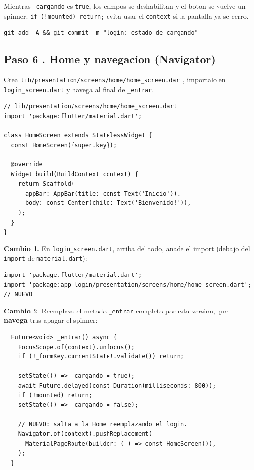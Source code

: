 \documentclass[11pt,a4paper,oneside]{book}
\newcommand{\file}[1]{\texttt{\textcolor{brandDark}{#1}}}
\begin{document}
\begin{whatbox}
Mientras \texttt{\_cargando} es \texttt{true}, los campos se deshabilitan y el boton
se vuelve un spinner. \texttt{if (!mounted) return;} evita usar el \texttt{context}
si la pantalla ya se cerro.
\end{whatbox}

\begin{lstlisting}[language={},numbers=none]
git add -A && git commit -m "login: estado de cargando"
\end{lstlisting}

\subsection*{Paso 6 . Home y navegacion (Navigator)}
\begin{wherebox}
Crea \file{lib/presentation/screens/home/home\_screen.dart}, importalo en
\file{login\_screen.dart} y navega al final de \texttt{\_entrar}.
\end{wherebox}

\begin{lstlisting}
// lib/presentation/screens/home/home_screen.dart
import 'package:flutter/material.dart';

class HomeScreen extends StatelessWidget {
  const HomeScreen({super.key});

  @override
  Widget build(BuildContext context) {
    return Scaffold(
      appBar: AppBar(title: const Text('Inicio')),
      body: const Center(child: Text('Bienvenido!')),
    );
  }
}
\end{lstlisting}

\noindent\textbf{Cambio 1.} En \file{login\_screen.dart}, arriba del todo, anade el
import (debajo del \texttt{import} de \texttt{material.dart}):
\begin{lstlisting}
import 'package:flutter/material.dart';
import 'package:app_login/presentation/screens/home/home_screen.dart';   // NUEVO
\end{lstlisting}

\noindent\textbf{Cambio 2.} Reemplaza el metodo \texttt{\_entrar} completo por esta
version, que \textbf{navega} tras apagar el spinner:
\begin{lstlisting}
  Future<void> _entrar() async {
    FocusScope.of(context).unfocus();
    if (!_formKey.currentState!.validate()) return;

    setState(() => _cargando = true);
    await Future.delayed(const Duration(milliseconds: 800));
    if (!mounted) return;
    setState(() => _cargando = false);

    // NUEVO: salta a la Home reemplazando el login.
    Navigator.of(context).pushReplacement(
      MaterialPageRoute(builder: (_) => const HomeScreen()),
    );
  }
\end{lstlisting}
\end{document}
